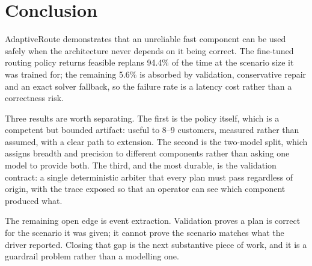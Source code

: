 \documentclass[11pt,a4paper]{article}
\begin{document}
\section{Conclusion}

AdaptiveRoute demonstrates that an unreliable fast component can be used safely when the
architecture never depends on it being correct. The fine-tuned routing policy returns feasible
replans 94.4\% of the time at the scenario size it was trained for; the remaining 5.6\% is absorbed
by validation, conservative repair and an exact solver fallback, so the failure rate is a latency
cost rather than a correctness risk.

Three results are worth separating. The first is the policy itself, which is a competent but bounded
artifact: useful to 8--9 customers, measured rather than assumed, with a clear path to extension. The
second is the two-model split, which assigns breadth and precision to different components rather
than asking one model to provide both. The third, and the most durable, is the validation contract:
a single deterministic arbiter that every plan must pass regardless of origin, with the trace exposed
so that an operator can see which component produced what.

The remaining open edge is event extraction. Validation proves a plan is correct for the scenario it
was given; it cannot prove the scenario matches what the driver reported. Closing that gap is the
next substantive piece of work, and it is a guardrail problem rather than a modelling one.
\end{document}
